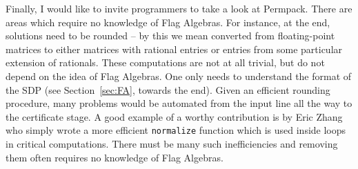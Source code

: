 Finally, I would like to invite programmers to take a look at Permpack. There are areas which require no knowledge of Flag Algebras. For instance, at the end, solutions need to be rounded -- by this we mean converted from floating-point matrices to either matrices with rational entries or entries from some particular extension of rationals. These computations are not at all trivial, but do not depend on the idea of Flag Algebras. One only needs to understand the format of the SDP (see Section~\ref{sec:FA}, towards the end). Given an efficient rounding procedure, many problems would be automated from the input line all the way to the certificate stage. A good example of a worthy contribution is by Eric Zhang who simply wrote a more efficient \texttt{normalize} function which is used inside loops in critical computations. There must be many such inefficiencies and removing them often requires no knowledge of Flag Algebras. 
